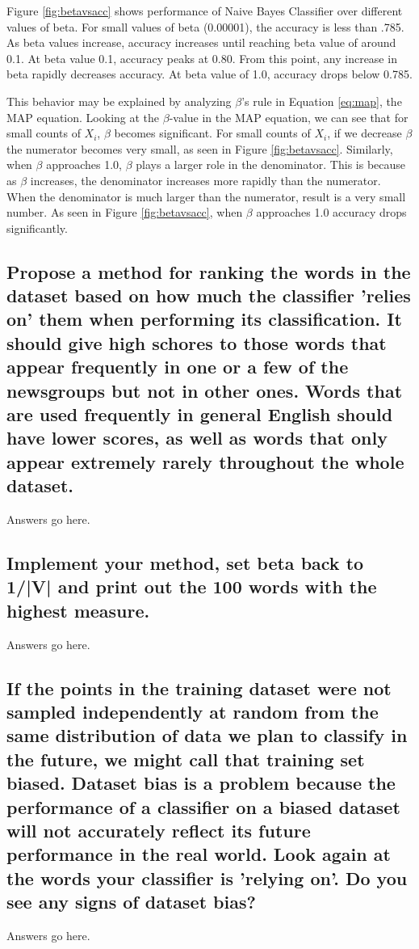\documentclass{IEEEtran}
\begin{document}
Figure \ref{fig:betavsacc} shows performance of Naive Bayes Classifier over different values of beta. For small values of beta (0.00001), the accuracy is less than .785. As beta values increase, accuracy increases until reaching beta value of around 0.1. At beta value 0.1, accuracy peaks at 0.80. From this point, any increase in beta rapidly decreases accuracy. At beta value of 1.0, accuracy drops below 0.785.


This behavior may be explained by analyzing $\beta$'s rule in Equation \ref{eq:map}, the MAP equation. Looking at the $\beta$-value in the MAP equation, we can see that for small counts of $X_i$, $\beta$ becomes significant. For small counts of $X_i$, if we decrease $\beta$ the numerator becomes very small, as seen in Figure \ref{fig:betavsacc}. Similarly, when $\beta$ approaches 1.0, $\beta$ plays a larger role in the denominator. This is because as $\beta$ increases, the denominator increases more rapidly than the numerator. When the denominator is much larger than the numerator, result is a very small number. As seen in Figure \ref{fig:betavsacc}, when $\beta$ approaches 1.0 accuracy drops significantly.



\subsection{Propose a method for ranking the words in the dataset based on how much the classifier 'relies on' them when performing its classification. It should give high schores to those words that appear frequently in one or a few of the newsgroups but not in other ones. Words that are used frequently in general English should have lower scores, as well as words that only appear extremely rarely throughout the whole dataset.}
Answers go here.

\subsection{Implement your method, set beta back to 1/|V| and print out the 100 words with the highest measure.}
Answers go here.

\subsection{If the points in the training dataset were not sampled independently at random from the same distribution of data we plan to classify in the future, we might call that training set biased. Dataset bias is a problem because the performance of a classifier on a biased dataset will not accurately reflect its future performance in the real world. Look again at the words your classifier is 'relying on'. Do you see any signs of dataset bias?}
Answers go here.
\end{document}
